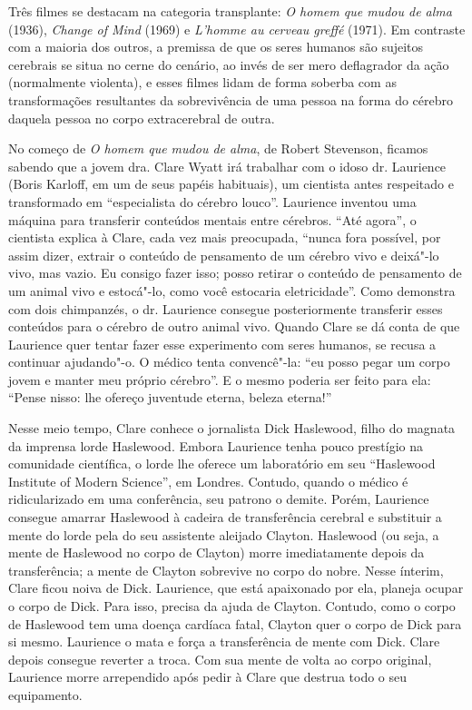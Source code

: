 Três filmes se destacam na categoria transplante: \emph{O homem que
mudou de alma} (1936), \emph{Change of Mind} (1969) e \emph{L'homme au
cerveau greffé} (1971). Em contraste com a maioria dos outros, a
premissa de que os seres humanos são sujeitos cerebrais se situa no
cerne do cenário, ao invés de ser mero deflagrador da ação (normalmente
violenta), e esses filmes lidam de forma soberba com as transformações
resultantes da sobrevivência de uma pessoa na forma do cérebro daquela
pessoa no corpo extracerebral de outra.

No começo de \emph{O homem que mudou de alma}, de Robert Stevenson,
ficamos sabendo que a jovem dra. Clare Wyatt irá trabalhar com o idoso
dr. Laurience (Boris Karloff, em um de seus papéis habituais), um
cientista antes respeitado e transformado em ``especialista do cérebro
louco''. Laurience inventou uma máquina para transferir conteúdos
mentais entre cérebros. ``Até agora'', o cientista explica à Clare, cada
vez mais preocupada, ``nunca fora possível, por assim dizer, extrair o
conteúdo de pensamento de um cérebro vivo e deixá"-lo vivo, mas vazio. Eu
consigo fazer isso; posso retirar o conteúdo de pensamento de um animal
vivo e estocá"-lo, como você estocaria eletricidade''. Como demonstra com
dois chimpanzés, o dr. Laurience consegue posteriormente transferir
esses conteúdos para o cérebro de outro animal vivo. Quando Clare se dá
conta de que Laurience quer tentar fazer esse experimento com seres
humanos, se recusa a continuar ajudando"-o. O médico tenta convencê"-la:
``eu posso pegar um corpo jovem e manter meu próprio cérebro''. E o
mesmo poderia ser feito para ela: ``Pense nisso: lhe ofereço juventude
eterna, beleza eterna!''

Nesse meio tempo, Clare conhece o jornalista Dick Haslewood, filho do
magnata da imprensa lorde Haslewood. Embora Laurience tenha pouco
prestígio na comunidade científica, o lorde lhe oferece um laboratório
em seu ``Haslewood Institute of Modern Science'', em Londres. Contudo,
quando o médico é ridicularizado em uma conferência, seu patrono o
demite. Porém, Laurience consegue amarrar Haslewood à cadeira de
transferência cerebral e substituir a mente do lorde pela do seu
assistente aleijado Clayton. Haslewood (ou seja, a mente de Haslewood no
corpo de Clayton) morre imediatamente depois da transferência; a mente
de Clayton sobrevive no corpo do nobre. Nesse ínterim, Clare ficou noiva
de Dick. Laurience, que está apaixonado por ela, planeja ocupar o corpo
de Dick. Para isso, precisa da ajuda de Clayton. Contudo, como o corpo
de Haslewood tem uma doença cardíaca fatal, Clayton quer o corpo de Dick
para si mesmo. Laurience o mata e força a transferência de mente com
Dick. Clare depois consegue reverter a troca. Com sua mente de volta ao
corpo original, Laurience morre arrependido após pedir à Clare que
destrua todo o seu equipamento.

